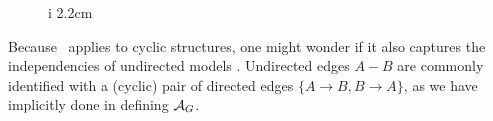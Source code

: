 \begin{wrapfigure}[4]{i}
        {2.2cm}
    \centering
\end{wrapfigure}
Because \scibility\ applies to cyclic structures,  one might wonder if
    it also captures the independencies of undirected models 
    \unskip.
Undirected edges $A {-} B$ are commonly identified
with a (cyclic) pair of directed edges $\{ A{\to}B, B{\to}A\}$,
as we have implicitly done in
defining $\mathcal A_G$. 
